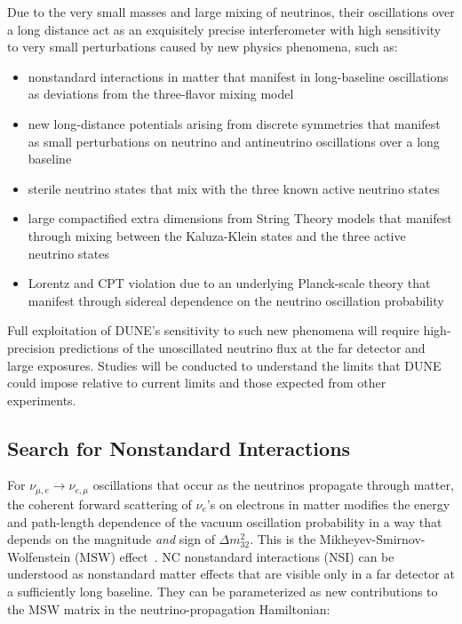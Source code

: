 Due to the very small masses and large mixing of neutrinos, their oscillations over a long distance
  act as an exquisitely precise interferometer with high sensitivity to very small perturbations caused by 
  new physics phenomena, such as:
  \begin{itemize}
  \item nonstandard interactions in matter that manifest in
    long-baseline oscillations as deviations from the three-flavor mixing model
  \item new long-distance potentials arising from discrete symmetries
    that manifest as small perturbations on neutrino and antineutrino
    oscillations over a long baseline
  \item sterile neutrino states that mix with the three known active neutrino states
  \item large compactified extra dimensions from String Theory models that manifest through mixing
    between the Kaluza-Klein states and the three active neutrino
    states
   \item Lorentz and CPT violation due to an underlying Planck-scale theory that manifest through sidereal dependence on the neutrino oscillation probability
  \end{itemize}
  Full exploitation of DUNE's sensitivity to such new phenomena
  will require high-precision predictions of the unoscillated
  neutrino flux at the far detector and large exposures. Studies will be conducted to understand the
limits that DUNE could impose relative to current limits and those expected from other experiments.
  
\subsection{Search for Nonstandard Interactions}

For $\nu_{\mu,e} \rightarrow \nu_{e,\mu}$ 
oscillations that occur as the neutrinos propagate through matter,  
the coherent forward scattering of $\nu_e$'s on electrons in matter 
modifies the energy and path-length dependence of the vacuum oscillation 
probability in a way that depends on the magnitude \emph{and} sign of $\Delta m^2_{32}$. 
This is  the Mikheyev-Smirnov-Wolfenstein (MSW) effect~\cite{Mikheev:1986gs,Wolfenstein:1977ue}.
NC nonstandard interactions (NSI) can be understood as nonstandard
matter effects that are visible only in a far detector at a
sufficiently long baseline. 
They can be parameterized as new contributions
to the MSW matrix in the neutrino-propagation Hamiltonian:

